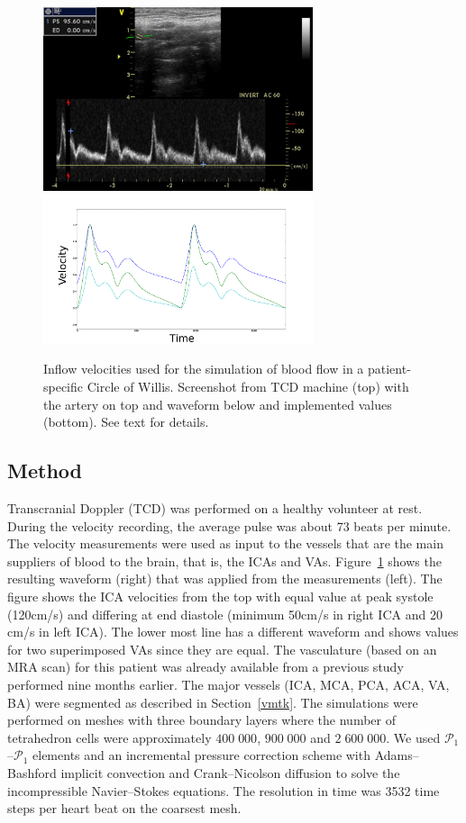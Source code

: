 \begin{figure}
  \begin{center}
      \includegraphics[width=7.9cm]{chapters/kvs-2/pdf/ica.pdf} \\
      \includegraphics[width=7.9cm]{chapters/kvs-2/pdf/cok_inflow.pdf}
  \end{center}
  \caption{Inflow velocities used for the simulation of blood flow in
    a patient-specific Circle of Willis. Screenshot from TCD machine
    (top) with the artery on top and waveform below and implemented
    values (bottom). See text for details.}
  \label{fig:kvs-2:cok_inflow}
\end{figure}

\subsection{Method}

Transcranial Doppler (TCD) was performed on a healthy volunteer at
rest. During the velocity recording, the average pulse was about 73
beats per minute. The velocity measurements
were used as input to the vessels that are the main suppliers
of blood to the brain, that is, the ICAs and
VAs. Figure~\ref{fig:kvs-2:cok_inflow} shows the resulting waveform
(right) that was applied from the measurements (left). The figure
shows the ICA velocities from the top with equal value at peak systole
(120cm/s) and differing at end diastole (minimum 50cm/s in right ICA
and 20 cm/s in left ICA). The lower most line has a different waveform
and shows values for two superimposed VAs since they are equal. The
vasculature (based on an MRA scan) for this patient was already available from a
previous study performed nine months earlier. The major vessels (ICA,
MCA, PCA, ACA, VA, BA) were segmented as described in
Section~\ref{vmtk}. The simulations were performed on meshes with
three boundary layers where the number of tetrahedron cells were approximately
$400\;000$, $900\;000$ and $2\;600\;000$. We used
$\mathcal{P}_1$--$\mathcal{P}_1$ elements and an incremental pressure
correction scheme with Adams--Bashford implicit convection and
Crank--Nicolson diffusion to solve the incompressible Navier--Stokes
equations. The resolution in time was 3532 time steps per heart beat
on the coarsest mesh.

